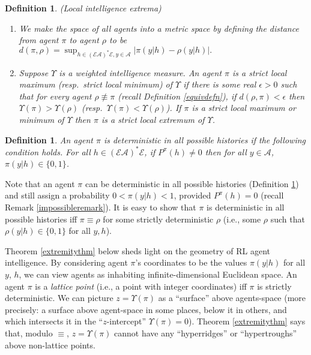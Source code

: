 \documentclass[twoside]{article}
\newtheorem{definition}[theorem]{Definition}
\begin{document}
\begin{definition}
    (Local intelligence extrema)
    \begin{enumerate}
    \item
        We make the space of all agents into a metric space by defining
        the distance from agent $\pi$
        to agent $\rho$ to be
        $
            d(\pi,\rho)
            =
            \sup_{h\in(\mathcal E\mathcal A)^*\mathcal E,y\in\mathcal A}\left|
                \pi(y|h) - \rho(y|h)
            \right|.
        $
    \item
        Suppose $\Upsilon$ is a weighted intelligence measure. An agent $\pi$
        is a \emph{strict local maximum} (resp.\ \emph{strict local minimum})
        of $\Upsilon$ if there is some real $\epsilon>0$
        such that for every agent $\rho\not\equiv\pi$
        (recall Definition \ref{equivdefn}), if $d(\rho,\pi)<\epsilon$
        then $\Upsilon(\pi)>\Upsilon(\rho)$ (resp.\ $\Upsilon(\pi)<\Upsilon(\rho)$).
        If $\pi$ is a strict local maximum or minimum of $\Upsilon$ then
        $\pi$ is a \emph{strict local extremum} of $\Upsilon$.
    \end{enumerate}
\end{definition}

\begin{definition}
\label{deterministicinpracticedefn}
    An agent $\pi$ is \emph{deterministic in all possible histories}
    if the following condition
    holds. For all $h\in(\mathcal E\mathcal A)^*\mathcal E$,
    if $P^\pi(h)\not=0$ then for all $y\in\mathcal A$,
    $\pi(y|h)\in\{0,1\}$.
\end{definition}

Note that an agent $\pi$ can be deterministic in all possible histories
(Definition \ref{deterministicinpracticedefn}) and still assign a
probability $0<\pi(y|h)<1$, provided $P^\pi(h)=0$ (recall Remark \ref{impossibleremark}).
It is easy to show that $\pi$ is deterministic in all possible histories iff $\pi\equiv\rho$
for some strictly
deterministic $\rho$ (i.e., some $\rho$ such that $\rho(y|h)\in\{0,1\}$ for
all $y,h$).

Theorem \ref{extremitythm} below sheds light on the geometry of RL agent intelligence.
By considering agent $\pi$'s coordinates to be
the values $\pi(y|h)$
for all $y$, $h$, we can view agents as inhabiting
infinite-dimensional Euclidean space.
An agent $\pi$ is a \emph{lattice point} (i.e., a point with integer coordinates)
iff $\pi$ is strictly deterministic.
We can picture $z=\Upsilon(\pi)$ as a ``surface'' above
agents-space
(more precisely: a surface above agent-space in some places,
below it in others, and which intersects it in the ``$z$-intercept''
$\Upsilon(\pi)=0$).
Theorem \ref{extremitythm} says that, modulo $\equiv$,
$z=\Upsilon(\pi)$
cannot have any ``hyperridges'' or ``hypertroughs'' above non-lattice points.
\end{document}
